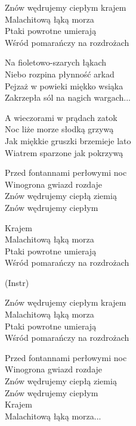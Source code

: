 \begin{text}
    \ifchorded{\hfill\break}
    Znów wędrujemy ciepłym krajem\\
    Malachitową łąką morza\\
    Ptaki powrotne umierają\\
    Wśród pomarańczy na rozdrożach

    Na fioletowo-szarych łąkach\\
    Niebo rozpina płynność arkad\\
    Pejzaż w powieki miękko wsiąka\\
    Zakrzepła sól na nagich wargach...

    A wieczorami w prądach zatok\\
    Noc liże morze słodką grzywą\\
    Jak miękkie gruszki brzemieje lato\\
    Wiatrem sparzone jak pokrzywą

    Przed fontannami perłowymi noc\\
    Winogrona gwiazd rozdaje\\
    Znów wędrujemy ciepłą ziemią\\
    Znów wędrujemy ciepłym

    Krajem\\
    Malachitową łąką morza\\
    Ptaki powrotne umierają\\
    Wśród pomarańczy na rozdrożach

    (Instr)

    Znów wędrujemy ciepłym krajem\\
    Malachitową łąką morza\\
    Ptaki powrotne umierają\\
    Wśród pomarańczy na rozdrożach

    Przed fontannami perłowymi noc\\
    Winogrona gwiazd rozdaje\\
    Znów wędrujemy ciepłą ziemią\\
    Znów wędrujemy ciepłym\\
    Krajem\\
    Malachitową łąką morza...
\end{text}

